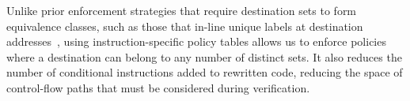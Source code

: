 Unlike prior enforcement strategies that require destination sets to form equivalence classes, such as those that in-line unique labels at destination addresses~\cite{abadi_cfi},
using instruction-specific policy tables allows us to enforce policies where a destination can belong to any number of distinct sets.
It also reduces the number of conditional instructions added to rewritten code, reducing the space of control-flow paths that must be considered during verification.


